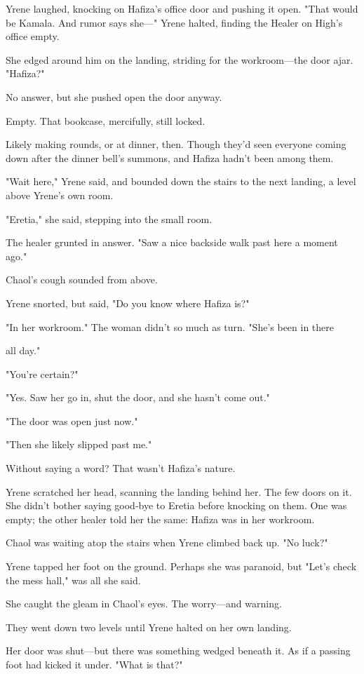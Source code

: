 Yrene laughed, knocking on Hafiza's office door and pushing it open. "That would be Kamala. And rumor says she---" Yrene halted, finding the Healer on High's office empty.

She edged around him on the landing, striding for the workroom---the door ajar. "Hafiza?"

No answer, but she pushed open the door anyway.

Empty. That bookcase, mercifully, still locked.

Likely making rounds, or at dinner, then. Though they'd seen everyone coming down after the dinner bell's summons, and Hafiza hadn't been among them.

"Wait here," Yrene said, and bounded down the stairs to the next landing, a level above Yrene's own room.

"Eretia," she said, stepping into the small room.

The healer grunted in answer. "Saw a nice backside walk past here a moment ago."

Chaol's cough sounded from above.

Yrene snorted, but said, "Do you know where Hafiza is?"

"In her workroom." The woman didn't so much as turn. "She's been in there

all day."

"You're  certain?"

"Yes. Saw her go in, shut the door, and she hasn't come out."

"The door was open just now."

"Then she likely slipped past me."

Without saying a word? That wasn't Hafiza's nature.

Yrene scratched her head, scanning the landing behind her. The few doors on it. She didn't bother saying good-bye to Eretia before knocking on them. One was empty; the other healer told her the same: Hafiza was in her workroom.

Chaol was waiting atop the stairs when Yrene climbed back up. "No luck?"

Yrene tapped her foot on the ground. Perhaps she was paranoid, but
 "Let's check the mess hall," was all she said.

She caught the gleam in Chaol's eyes. The worry---and warning.

They went down two levels until Yrene halted on her own landing.

Her door was shut---but there was something wedged beneath it. As if a passing foot had kicked it under. "What is that?"

